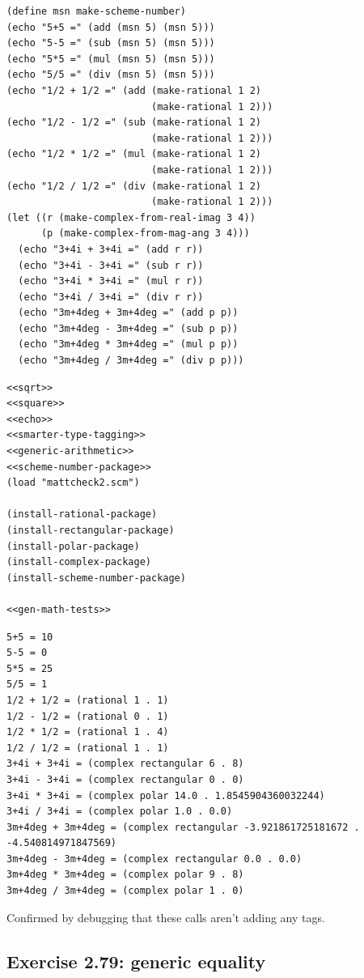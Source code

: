 \documentclass[final,fleqn,titlepage,twoside]{article}
\begin{document}
\begin{verbatim}
(define msn make-scheme-number)
(echo "5+5 =" (add (msn 5) (msn 5)))
(echo "5-5 =" (sub (msn 5) (msn 5)))
(echo "5*5 =" (mul (msn 5) (msn 5)))
(echo "5/5 =" (div (msn 5) (msn 5)))
(echo "1/2 + 1/2 =" (add (make-rational 1 2)
                         (make-rational 1 2)))
(echo "1/2 - 1/2 =" (sub (make-rational 1 2)
                         (make-rational 1 2)))
(echo "1/2 * 1/2 =" (mul (make-rational 1 2)
                         (make-rational 1 2)))
(echo "1/2 / 1/2 =" (div (make-rational 1 2)
                         (make-rational 1 2)))
(let ((r (make-complex-from-real-imag 3 4))
      (p (make-complex-from-mag-ang 3 4)))
  (echo "3+4i + 3+4i =" (add r r))
  (echo "3+4i - 3+4i =" (sub r r))
  (echo "3+4i * 3+4i =" (mul r r))
  (echo "3+4i / 3+4i =" (div r r))
  (echo "3m+4deg + 3m+4deg =" (add p p))
  (echo "3m+4deg - 3m+4deg =" (sub p p))
  (echo "3m+4deg * 3m+4deg =" (mul p p))
  (echo "3m+4deg / 3m+4deg =" (div p p)))
\end{verbatim}
\begin{verbatim}
<<sqrt>>
<<square>>
<<echo>>
<<smarter-type-tagging>>
<<generic-arithmetic>>
<<scheme-number-package>>
(load "mattcheck2.scm")

(install-rational-package)
(install-rectangular-package)
(install-polar-package)
(install-complex-package)
(install-scheme-number-package)

<<gen-math-tests>>
\end{verbatim}

\begin{verbatim}
5+5 = 10 
5-5 = 0 
5*5 = 25 
5/5 = 1 
1/2 + 1/2 = (rational 1 . 1) 
1/2 - 1/2 = (rational 0 . 1) 
1/2 * 1/2 = (rational 1 . 4) 
1/2 / 1/2 = (rational 1 . 1) 
3+4i + 3+4i = (complex rectangular 6 . 8) 
3+4i - 3+4i = (complex rectangular 0 . 0) 
3+4i * 3+4i = (complex polar 14.0 . 1.8545904360032244) 
3+4i / 3+4i = (complex polar 1.0 . 0.0) 
3m+4deg + 3m+4deg = (complex rectangular -3.921861725181672 . -4.540814971847569) 
3m+4deg - 3m+4deg = (complex rectangular 0.0 . 0.0) 
3m+4deg * 3m+4deg = (complex polar 9 . 8) 
3m+4deg / 3m+4deg = (complex polar 1 . 0) 
\end{verbatim}

Confirmed by debugging that these calls aren't adding any tags.

\subsection{Exercise 2.79: generic equality}
\label{sec:org2ae333c}
\end{document}
